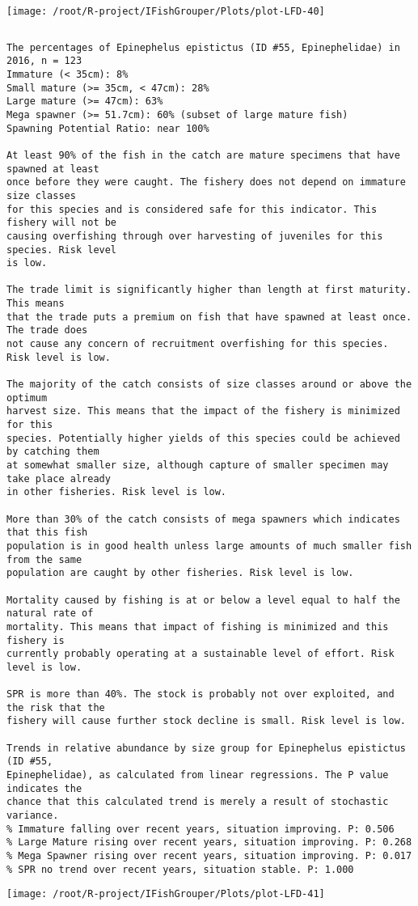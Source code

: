 \documentclass{report}\usepackage[]{graphicx}\usepackage[]{color}
\makeatletter
\def\maxwidth{ %
  \ifdim\Gin@nat@width>\linewidth
    \linewidth
  \else
    \Gin@nat@width
  \fi
}
\newenvironment{kframe}{%
 \def\at@end@of@kframe{}%
 \ifinner\ifhmode%
  \def\at@end@of@kframe{\end{minipage}}%
  \begin{minipage}{\columnwidth}%
 \fi\fi%
 \def\FrameCommand##1{\hskip\@totalleftmargin \hskip-\fboxsep
 \colorbox{shadecolor}{##1}\hskip-\fboxsep
     \hskip-\linewidth \hskip-\@totalleftmargin \hskip\columnwidth}%
 \MakeFramed {\advance\hsize-\width
   \@totalleftmargin\z@ \linewidth\hsize
   \@setminipage}}%
 {\par\unskip\endMakeFramed%
 \at@end@of@kframe}
\newenvironment{knitrout}{}{} %
\makeatother
\begin{document}
\begin{knitrout}
\texttt{[image: /root/R-project/IFishGrouper/Plots/plot-LFD-40]} 
\begin{kframe}\begin{verbatim}
\end{verbatim}
\end{kframe}
\clearpage
\newpage
\begin{kframe}\begin{verbatim}The percentages of Epinephelus epistictus (ID #55, Epinephelidae) in 2016, n = 123
Immature (< 35cm): 8%
Small mature (>= 35cm, < 47cm): 28%
Large mature (>= 47cm): 63%
Mega spawner (>= 51.7cm): 60% (subset of large mature fish)
Spawning Potential Ratio: near 100%
 
At least 90% of the fish in the catch are mature specimens that have spawned at least
once before they were caught. The fishery does not depend on immature size classes
for this species and is considered safe for this indicator. This fishery will not be
causing overfishing through over harvesting of juveniles for this species. Risk level
is low.

The trade limit is significantly higher than length at first maturity.  This means
that the trade puts a premium on fish that have spawned at least once. The trade does
not cause any concern of recruitment overfishing for this species. Risk level is low.

The majority of the catch consists of size classes around or above the optimum
harvest size. This means that the impact of the fishery is minimized for this
species. Potentially higher yields of this species could be achieved by catching them
at somewhat smaller size, although capture of smaller specimen may take place already
in other fisheries. Risk level is low.

More than 30% of the catch consists of mega spawners which indicates that this fish
population is in good health unless large amounts of much smaller fish from the same
population are caught by other fisheries. Risk level is low.
 
Mortality caused by fishing is at or below a level equal to half the natural rate of
mortality. This means that impact of fishing is minimized and this fishery is
currently probably operating at a sustainable level of effort. Risk level is low.
 
SPR is more than 40%. The stock is probably not over exploited, and the risk that the
fishery will cause further stock decline is small. Risk level is low.
 
Trends in relative abundance by size group for Epinephelus epistictus (ID #55,
Epinephelidae), as calculated from linear regressions. The P value indicates the
chance that this calculated trend is merely a result of stochastic variance.
% Immature falling over recent years, situation improving. P: 0.506
% Large Mature rising over recent years, situation improving. P: 0.268
% Mega Spawner rising over recent years, situation improving. P: 0.017
% SPR no trend over recent years, situation stable. P: 1.000
\end{verbatim}
\end{kframe}
\texttt{[image: /root/R-project/IFishGrouper/Plots/plot-LFD-41]} 


\end{knitrout}
\end{document}
